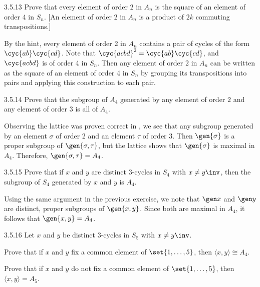 \begin{exercise}{3.5.13}
    Prove that every element of order $2$ in $A_n$ is the square of an element of order $4$ in $S_n$. [An element of order $2$ in $A_n$ is a product of $2k$ commuting transpositions.]
\end{exercise}

\begin{sol}
    By the hint, every element of order 2 in $A_n$ contains a pair of cycles of the form $\cyc{a b}\cyc{c d}$.
	Note that $\cyc{a c b d}^2 = \cyc{a b}\cyc{c d}$, and $\cyc{a c b d}$ is of order 4 in $S_n$.
	Then any element of order 2 in $A_n$ can be written as the square of an element of order 4 in $S_n$ by grouping its transpositions into pairs and applying this construction to each pair.
\end{sol}

\begin{exercise}{3.5.14}
    Prove that the subgroup of $A_4$ generated by any element of order $2$ and any element of order $3$ is all of $A_4$.
\end{exercise}

\begin{sol}
    Observing the lattice was proven correct in , we see that any subgroup generated by an element $\sigma$ of order 2 and an element $\tau$ of order 3.
	Then $\gen{\sigma}$ is a proper subgroup of $\gen{\sigma, \tau}$, but the lattice shows that $\gen{\sigma}$ is maximal in $A_4$.
	Therefore, $\gen{\sigma, \tau} = A_4$.
\end{sol}

\begin{exercise}{3.5.15}
    Prove that if $x$ and $y$ are distinct $3$-cycles in $S_4$ with $x \ne y\inv$, then the subgroup of $S_4$ generated by $x$ and $y$ is $A_4$.
\end{exercise}

\begin{sol}
    Using the same argument in the previous exercise, we note that $\gen x$ and $\gen y$ are distinct, proper subgroups of $\gen{x, y}$.
	Since both are maximal in $A_4$, it follows that $\gen{x, y} = A_4$.
\end{sol}

\begin{exercise}{3.5.16}
    Let $x$ and $y$ be distinct $3$-cycles in $S_5$ with $x\ne y\inv$.
    \begin{subexercises}
    \item Prove that if $x$ and $y$ fix a common element of $\set{1,\dots,5}$, then $\langle x,y\rangle \cong A_4$.
    \item Prove that if $x$ and $y$ do not fix a common element of $\set{1,\dots,5}$, then $\langle x,y\rangle = A_5$.
    \end{subexercises}
\end{exercise}

